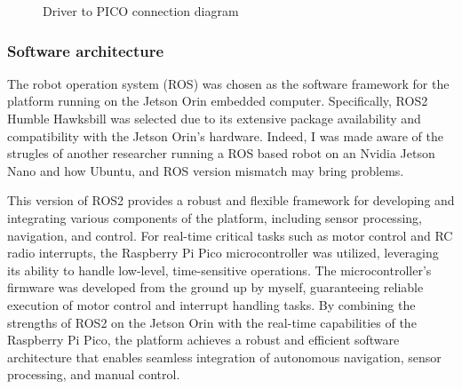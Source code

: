 \documentclass[11pt]{article}
\begin{document}
            
            
            \begin{figure}[h]
                \centering
                Driver to PICO connection diagram
                \label{fig:driver_to_pico}
            \end{figure}

        
        
        \subsubsection{Software architecture}


        The robot operation system (ROS) was chosen as the software framework for the platform running on the Jetson Orin embedded computer. Specifically, ROS2 Humble Hawksbill was selected due to its extensive package availability and compatibility with the Jetson Orin's hardware. Indeed, I was made aware of the strugles of another researcher running a ROS based robot on an Nvidia Jetson Nano and how Ubuntu, and ROS version mismatch may bring problems. 
        
        This version of ROS2 provides a robust and flexible framework for developing and integrating various components of the platform, including sensor processing, navigation, and control. For real-time critical tasks such as motor control and RC radio interrupts, the Raspberry Pi Pico microcontroller was utilized, leveraging its ability to handle low-level, time-sensitive operations. The microcontroller's firmware was developed from the ground up by myself, guaranteeing reliable execution of motor control and interrupt handling tasks. By combining the strengths of ROS2 on the Jetson Orin with the real-time capabilities of the Raspberry Pi Pico, the platform achieves a robust and efficient software architecture that enables seamless integration of autonomous navigation, sensor processing, and manual control.
\end{document}

